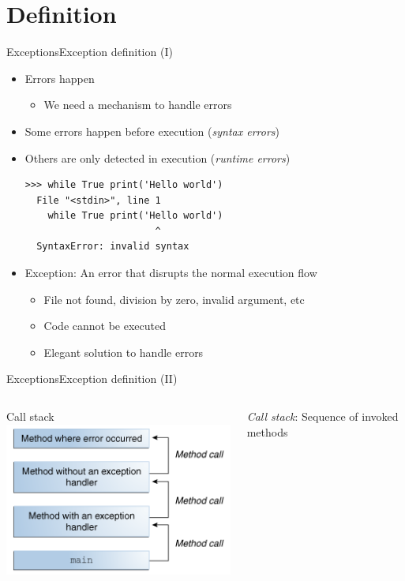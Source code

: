 \documentclass[10pt,compress]{beamer} %
\begin{document}
\section{Definition}
\begin{frame}[fragile]{Exceptions}{Exception definition (I)}
	\begin{itemize}
	\item Errors happen
	\begin{itemize}
		\item We need a mechanism to handle errors
	\end{itemize}
	\item Some errors happen before execution (\textit{syntax errors})
		\item Others are only detected in execution (\textit{runtime errors})
\begin{verbatim}
>>> while True print('Hello world')
  File "<stdin>", line 1
    while True print('Hello world')
	                   ^
  SyntaxError: invalid syntax
\end{verbatim}
	\item \alert{Exception}: An error that disrupts the normal execution flow
	\begin{itemize}
		\item File not found, division by zero, invalid argument, etc
		\item Code cannot be executed
		\item Elegant solution to handle errors
	\end{itemize}
	\end{itemize}
\end{frame}

\begin{frame}{Exceptions}{Exception definition (II)}
    \begin{columns}
		\centering Call stack
		\centering \includegraphics[width=0.8\linewidth]{figs/exceptions-callstack.png}

		\textit{Call stack}: Sequence of invoked methods
	\end{columns}
\end{frame}
\end{document}
